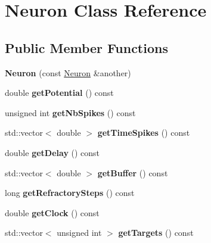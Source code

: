 \hypertarget{classNeuron}{}\section{Neuron Class Reference}
\label{classNeuron}
\subsection*{Public Member Functions}
\begin{DoxyCompactItemize}
\item 
\mbox{\label{classNeuron_ae9da3a26f28e0e594ccfac1723b69277}} 
{\bfseries Neuron} (const \hyperlink{classNeuron}{Neuron} \&another)
\item 
\mbox{\label{classNeuron_acf44c8e2b57be445c2d802094a0c4f10}} 
double {\bfseries get\+Potential} () const
\item 
\mbox{\label{classNeuron_a0fb2734908d23505237f09f23a68964a}} 
unsigned int {\bfseries get\+Nb\+Spikes} () const
\item 
\mbox{\label{classNeuron_add5a535ca0f35e89c4bb9e4a3bce1443}} 
std\+::vector$<$ double $>$ {\bfseries get\+Time\+Spikes} () const
\item 
\mbox{\label{classNeuron_aa1c3d933b84d2fdc60231c27f2075d82}} 
double {\bfseries get\+Delay} () const
\item 
\mbox{\label{classNeuron_ab553b59386a01f1a08d1d35c4373ff6e}} 
std\+::vector$<$ double $>$ {\bfseries get\+Buffer} () const
\item 
\mbox{\label{classNeuron_af0cb28aa6059bfcde4458b06a16ccfcb}} 
long {\bfseries get\+Refractory\+Steps} () const
\item 
\mbox{\label{classNeuron_a91b7d616e5b32761b542533e807eb8a6}} 
double {\bfseries get\+Clock} () const
\item 
\mbox{\label{classNeuron_a6bfa8a339bc40708293050a5a81bb679}} 
std\+::vector$<$ unsigned int $>$ {\bfseries get\+Targets} () const
\item 
\mbox{\label{classNeuron_a31f1ab91cacae107aca969c949b491a2}} 

\end{DoxyCompactItemize}
